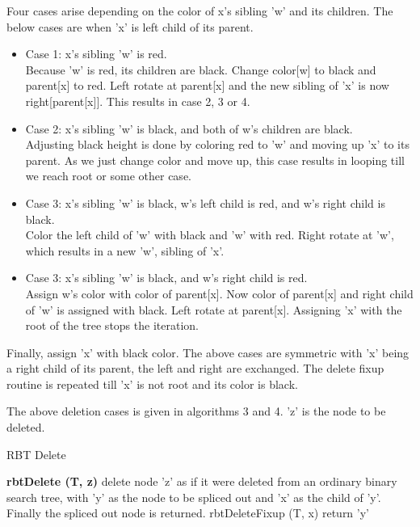 \documentclass[11pt, oneside, a4paper]{article}
\begin{document}
Four cases arise depending on the color of x's sibling 'w' and its children.  The below cases are when 'x' is left child of its parent.
\begin{itemize}
\item Case 1: x's sibling 'w' is red.\\
	Because 'w' is red, its children are black.  Change color[w] to black and parent[x] to red.  Left rotate at parent[x] and the new sibling of 'x' is now right[parent[x]].  This results in case 2, 3 or 4.
\item Case 2: x's sibling 'w' is black, and both of w's children are black.\\
	Adjusting black height is done by coloring red to 'w' and moving up 'x' to its parent.  As we just change color and move up, this case results in looping till we reach root or some other case.
\item Case 3: x's sibling 'w' is black, w's left child is red, and w's right child is black.\\
	Color the left child of 'w' with black and 'w' with red.  Right rotate at 'w', which results in a new 'w', sibling of 'x'.
\item Case 3: x's sibling 'w' is black, and w's right child is red.\\
	Assign w's color with color of parent[x].  Now color of parent[x] and right child of 'w' is assigned with black.  Left rotate at parent[x].  Assigning 'x' with the root of the tree stops the iteration.	
\end{itemize}
Finally, assign 'x' with black color.  The above cases are symmetric with 'x' being a right child of its parent, the left and right are exchanged.   The delete fixup routine is repeated till 'x' is not root and its color is black.

The above deletion cases is given in algorithms 3 and 4. 'z' is the node to be deleted.

\begin{algorithm}
\caption {RBT Delete}
\label {alg3}
\begin{algorithmic}[1]
\STATE \textbf {rbtDelete (T, z)}
\STATE delete node 'z' as if it were deleted from an ordinary binary search tree, with 'y' as the node to be spliced out and 'x' as the child of 'y'.  Finally the spliced out node is returned.
\STATE rbtDeleteFixup (T, x)
\ENDIF
\STATE return 'y'
\end{algorithmic}
\end{algorithm}
\end{document}

